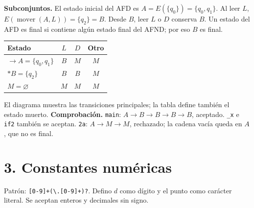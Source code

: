 \documentclass[10pt,letterpaper]{article}
\newcommand{\tok}[1]{\texttt{#1}}
\begin{document}
\textbf{Subconjuntos.} El estado inicial del AFD es $A=E(\{q_0\})=\{q_0,q_1\}$. Al leer $L$, $E(\operatorname{mover}(A,L))=\{q_2\}=B$. Desde $B$, leer $L$ o $D$ conserva $B$. Un estado del AFD es final si contiene algún estado final del AFND; por eso $B$ es final.
\begin{center}\begin{tabular}{lccc}\toprule Estado & $L$ & $D$ & Otro\\\midrule
$\to A=\{q_0,q_1\}$ & $B$ & $M$ & $M$\\
$*B=\{q_2\}$ & $B$ & $B$ & $M$\\
$M=\varnothing$ & $M$ & $M$ & $M$\\\bottomrule\end{tabular}\end{center}
\begin{center}\end{center}
El diagrama muestra las transiciones principales; la tabla define también el estado muerto.
\textbf{Comprobación.} \tok{main}: $A\to B\to B\to B\to B$, aceptado. \tok{\_x} e \tok{if2} también se aceptan. \tok{2a}: $A\to M\to M$, rechazado; la cadena vacía queda en $A$, que no es final.

\newpage
\section*{3. Constantes numéricas}
Patrón: \verb|[0-9]+(\.[0-9]+)?|. Defino $d$ como dígito y el punto como carácter literal. Se aceptan enteros y decimales sin signo.
\end{document}
